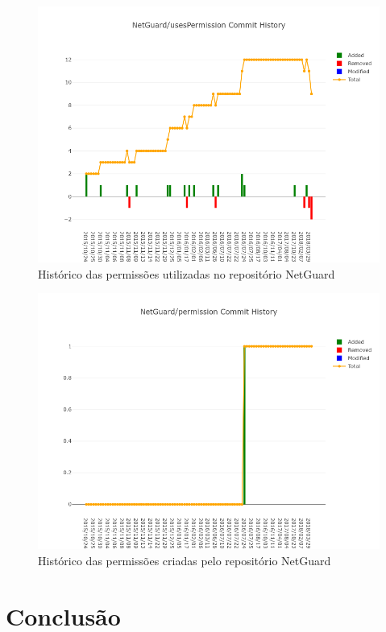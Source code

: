 \documentclass[a4paper,12pt]{article}
\begin{document}
\begin{figure}[H]
\centering
\includegraphics[width=\linewidth,height=0.5\linewidth]{imgs/NetGuard_usesPermission_history.png}
\caption{Histórico das permissões utilizadas no repositório NetGuard}
\label{fig:repouses}
\end{figure}

\begin{figure}[H]
\centering
\includegraphics[width=\linewidth,height=0.5\linewidth]{imgs/NetGuard_permission_history.png}
\caption{Histórico das permissões criadas pelo repositório NetGuard}
\label{fig:repopermission}
\end{figure}




\newpage

\section{Conclusão}%
\end{document}
